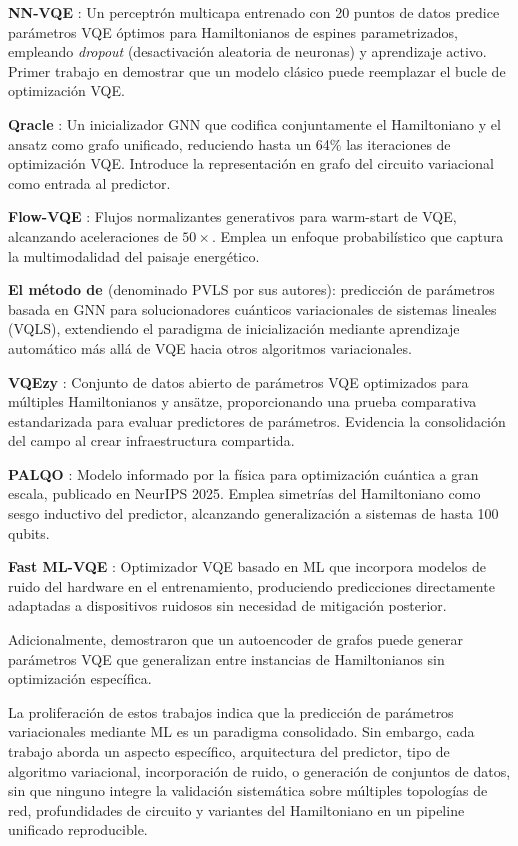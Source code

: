 \documentclass[11pt,a4paper,spanish]{book}
\begin{document}
\textbf{NN-VQE} \citep{miao2024}: Un perceptrón multicapa entrenado con 20 puntos de datos predice parámetros VQE óptimos para Hamiltonianos de espines parametrizados, empleando \emph{dropout} (desactivación aleatoria de neuronas) y aprendizaje activo. Primer trabajo en demostrar que un modelo clásico puede reemplazar el bucle de optimización VQE.

\textbf{Qracle} \citep{zhang2025}: Un inicializador GNN que codifica conjuntamente el Hamiltoniano y el ansatz como grafo unificado, reduciendo hasta un 64\% las iteraciones de optimización VQE. Introduce la representación en grafo del circuito variacional como entrada al predictor.

\textbf{Flow-VQE} \citep{zou2026}: Flujos normalizantes generativos para warm-start de VQE, alcanzando aceleraciones de $50\times$. Emplea un enfoque probabilístico que captura la multimodalidad del paisaje energético.

\textbf{El método de \citet{yang2024pvls}} (denominado PVLS por sus autores): predicción de parámetros basada en GNN para solucionadores cuánticos variacionales de sistemas lineales (VQLS), extendiendo el paradigma de inicialización mediante aprendizaje automático más allá de VQE hacia otros algoritmos variacionales.

\textbf{VQEzy} \citep{zhang2025vqezy}: Conjunto de datos abierto de parámetros VQE optimizados para múltiples Hamiltonianos y ansätze, proporcionando una prueba comparativa estandarizada para evaluar predictores de parámetros. Evidencia la consolidación del campo al crear infraestructura compartida.

\textbf{PALQO} \citep{huang2025palqo}: Modelo informado por la física para optimización cuántica a gran escala, publicado en NeurIPS 2025. Emplea simetrías del Hamiltoniano como sesgo inductivo del predictor, alcanzando generalización a sistemas de hasta 100 qubits.

\textbf{Fast ML-VQE} \citep{karim2025}: Optimizador VQE basado en ML que incorpora modelos de ruido del hardware en el entrenamiento, produciendo predicciones directamente adaptadas a dispositivos ruidosos sin necesidad de mitigación posterior.

Adicionalmente, \citet{lee2026} demostraron que un autoencoder de grafos puede generar parámetros VQE que generalizan entre instancias de Hamiltonianos sin optimización específica.

La proliferación de estos trabajos indica que la predicción de parámetros variacionales mediante ML es un paradigma consolidado. Sin embargo, cada trabajo aborda un aspecto específico, arquitectura del predictor, tipo de algoritmo variacional, incorporación de ruido, o generación de conjuntos de datos, sin que ninguno integre la validación sistemática sobre múltiples topologías de red, profundidades de circuito y variantes del Hamiltoniano en un pipeline unificado reproducible.
\end{document}
